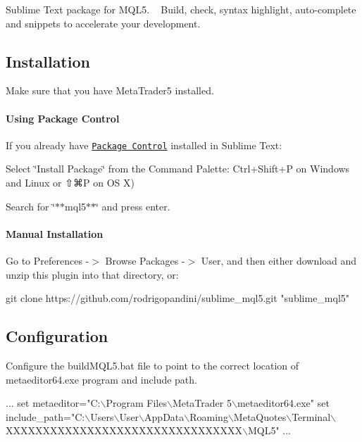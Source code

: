 Sublime Text package for M\+Q\+L5. ~\newline
Build, check, syntax highlight, auto-\/complete and snippets to accelerate your development.



\subsection*{Installation }

Make sure that you have Meta\+Trader5 installed. ~\newline
 \paragraph*{Using Package Control}

If you already have \href{http://wbond.net/sublime_packages/package_control/}{\tt Package Control} installed in Sublime Text\+:


\begin{DoxyItemize}
\item Select \char`\"{}\+Install Package\char`\"{} from the Command Palette\+: {\ttfamily Ctrl+\+Shift+P} on Windows and Linux or {\ttfamily ⇧⌘P} on OS X)
\item Search for \char`\"{}$\ast$$\ast$mql5$\ast$$\ast$\char`\"{} and press {\ttfamily enter}.
\end{DoxyItemize}

\paragraph*{Manual Installation}

Go to {\ttfamily Preferences -\/$>$ Browse Packages -\/$>$ User}, and then either download and unzip this plugin into that directory, or\+:


\begin{DoxyCode}
git clone https://github.com/rodrigopandini/sublime\_mql5.git "sublime\_mql5"
\end{DoxyCode}


\subsection*{Configuration }

Configure the {\ttfamily build\+M\+Q\+L5.\+bat} file to point to the correct location of {\ttfamily metaeditor64.\+exe} program and include path. 
\begin{DoxyCode}
...
set metaeditor="C:\(\backslash\)Program Files\(\backslash\)MetaTrader 5\(\backslash\)metaeditor64.exe"
set include\_path="C:\(\backslash\)Users\(\backslash\)User\(\backslash\)AppData\(\backslash\)Roaming\(\backslash\)MetaQuotes\(\backslash\)Terminal\(\backslash\)XXXXXXXXXXXXXXXXXXXXXXXXXXXXXXXX\(\backslash\)MQL5"
...
\end{DoxyCode}


